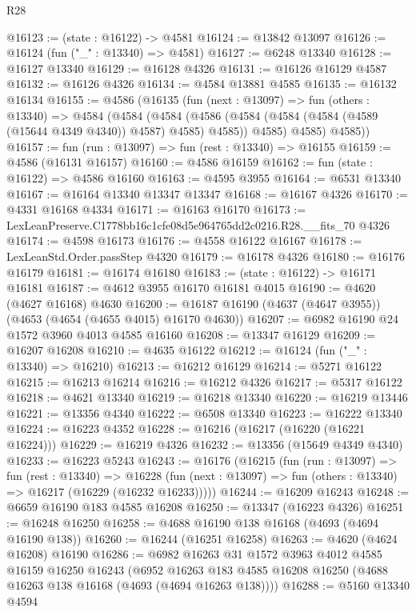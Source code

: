 \begin{lexlean}{R28}
\begin{coremodule}
@16123 := (state : @16122) -> @4581
@16124 := @13842 @13097
@16126 := @16124 (fun ("_" : @13340) => @4581)
@16127 := @6248 @13340
@16128 := @16127 @13340
@16129 := @16128 @4326
@16131 := @16126 @16129 @4587
@16132 := @16126 @4326
@16134 := @4584 @13881 @4585
@16135 := @16132 @16134
@16155 := @4586
    (@16135
      (fun (next : @13097) =>
      fun (others : @13340) =>
      @4584
        (@4584
          (@4584
            (@4586 (@4584 (@4584 (@4584 (@4589 (@15644 @4349 @4340)) @4587) @4585) @4585))
            @4585)
          @4585)
        @4585))
@16157 := fun (run : @13097) => fun (rest : @13340) => @16155
@16159 := @4586 (@16131 @16157)
@16160 := @4586 @16159
@16162 := fun (state : @16122) => @4586 @16160
@16163 := @4595 @3955
@16164 := @6531 @13340
@16167 := @16164 @13340 @13347 @13347
@16168 := @16167 @4326
@16170 := @4331 @16168 @4334
@16171 := @16163 @16170
@16173 := LexLeanPreserve.C1778bb16c1cfe08d5e964765dd2c0216.R28.__fits_70 @4326
@16174 := @4598 @16173
@16176 := @4558 @16122 @16167
@16178 := LexLeanStd.Order.passStep @4320
@16179 := @16178 @4326
@16180 := @16176 @16179
@16181 := @16174 @16180
@16183 := (state : @16122) -> @16171 @16181
@16187 := @4612 @3955 @16170 @16181 @4015
@16190 := @4620 (@4627 @16168) @4630
@16200 := @16187 @16190 (@4637 (@4647 @3955)) (@4653 (@4654 (@4655 @4015) @16170 @4630))
@16207 := @6982 @16190 @24 @1572 @3960 @4013 @4585 @16160
@16208 := @13347 @16129
@16209 := @16207 @16208
@16210 := @4635 @16122
@16212 := @16124 (fun ("_" : @13340) => @16210)
@16213 := @16212 @16129
@16214 := @5271 @16122
@16215 := @16213 @16214
@16216 := @16212 @4326
@16217 := @5317 @16122
@16218 := @4621 @13340
@16219 := @16218 @13340
@16220 := @16219 @13446
@16221 := @13356 @4340
@16222 := @6508 @13340
@16223 := @16222 @13340
@16224 := @16223 @4352
@16228 := @16216 (@16217 (@16220 (@16221 @16224)))
@16229 := @16219 @4326
@16232 := @13356 (@15649 @4349 @4340)
@16233 := @16223 @5243
@16243 := @16176
    (@16215
      (fun (run : @13097) =>
      fun (rest : @13340) =>
      @16228 (fun (next : @13097) => fun (others : @13340) => @16217 (@16229 (@16232 @16233)))))
@16244 := @16209 @16243
@16248 := @6659 @16190 @183 @4585 @16208
@16250 := @13347 (@16223 @4326)
@16251 := @16248 @16250
@16258 := @4688 @16190 @138 @16168 (@4693 (@4694 @16190 @138))
@16260 := @16244 (@16251 @16258)
@16263 := @4620 (@4624 @16208) @16190
@16286 := @6982
    @16263
    @31
    @1572
    @3963
    @4012
    @4585
    @16159
    @16250
    @16243
    (@6952 @16263 @183 @4585 @16208 @16250 (@4688 @16263 @138 @16168 (@4693 (@4694 @16263 @138))))
@16288 := @5160 @13340 @4594

\end{coremodule}
\end{lexlean}
